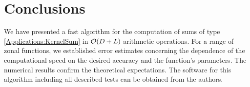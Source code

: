 \documentclass[11pt,a4paper,twoside,bibtotoc]{scrartcl}
\theoremstyle{plain}
\theoremstyle{definition}
\theoremstyle{remark}
\numberwithin{equation}{section}
\numberwithin{table}{section}
\numberwithin{figure}{section}
\begin{document}
\section{Conclusions}

We have presented a fast algorithm for the computation of sums of type
\eqref{Applications:KernelSum} in ${\cal O} (D + L)$ arithmetic operations.
For a range of zonal functions, we established error estimates 
concerning the dependence of the computational speed on the desired accuracy 
and the function's parameters. The numerical results confirm the theoretical 
expectations.
The software for this algorithm including all described tests can be
obtained from the authors.



\end{document}
